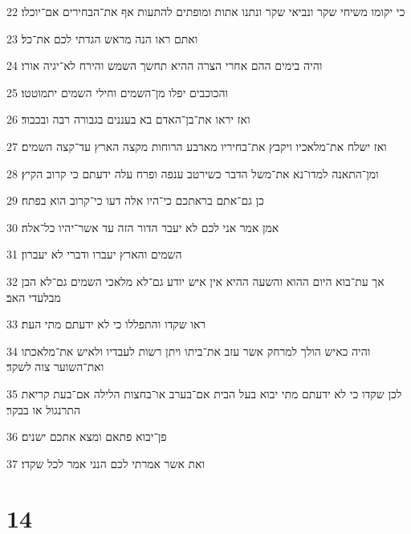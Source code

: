 \par 22 כי יקומו משיחי שקר ונביאי שקר ונתנו אתות ומופתים להתעות אף את־הבחירים אם־יוכלו׃
\par 23 ואתם ראו הנה מראש הגדתי לכם את־כל׃
\par 24 והיה בימים ההם אחרי הצרה ההיא תחשך השמש והירח לא־יגיה אורו׃
\par 25 והכוכבים יפלו מן־השמים וחילי השמים יתמוטטו׃
\par 26 ואז יראו את־בן־האדם בא בעננים בגבורה רבה ובכבוד׃
\par 27 ואז ישלח את־מלאכיו ויקבץ את־בחיריו מארבע הרוחות מקצה הארץ עד־קצה השמים׃
\par 28 ומן־התאנה למדו־נא את־משל הדבר כשירטב ענפה ופרח עלה ידעתם כי קרוב הקיץ׃
\par 29 כן גם־אתם בראתכם כי־היו אלה דעו כי־קרוב הוא בפתח׃
\par 30 אמן אמר אני לכם לא יעבר הדור הזה עד אשר־יהיו כל־אלה׃
\par 31 השמים והארץ יעברו ודברי לא יעברון׃
\par 32 אך עת־בוא היום ההוא והשעה ההיא אין איש יודע גם־לא מלאכי השמים גם־לא הבן מבלעדי האב׃
\par 33 ראו שקדו והתפללו כי לא ידעתם מתי העת׃
\par 34 והיה כאיש הולך למרחק אשר עזב את־ביתו ויתן רשות לעבדיו ולאיש את־מלאכתו ואת־השוער צוה לשקד׃
\par 35 לכן שקדו כי לא ידעתם מתי יבוא בעל הבית אם־בערב או־בחצות הלילה אם־בעת קריאת התרנגול או בבקר׃
\par 36 פן־יבוא פתאם ומצא אתכם ישנים׃
\par 37 ואת אשר אמרתי לכם הנני אמר לכל שקדו׃

\chapter{14}

